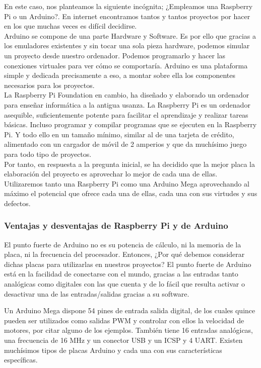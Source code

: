 En este caso, nos planteamos la siguiente incógnita; ¿Empleamos una Raspberry Pi o un Arduino?. En internet encontramos tantos y tantos proyectos por 
hacer en los que muchas veces es difícil decidirse.\\

Arduino se compone de una parte Hardware y Software. Es por ello que gracias a los emuladores existentes y sin tocar una sola pieza hardware, podemos simular un proyecto desde 
nuestro ordenador. Podemos programarlo y hacer las conexiones virtuales para ver cómo se comportaría. Arduino es una plataforma simple y dedicada precisamente a eso, 
a montar sobre ella los componentes necesarios para los proyectos. \\

La Raspberry Pi Foundation en cambio, ha diseñado y elaborado un ordenador para enseñar informática a la antigua usanza. La Raspberry Pi es un ordenador asequible, 
suficientemente potente para facilitar el aprendizaje y realizar tareas básicas. Incluso programar y compilar programas que se ejecuten en la Raspberry Pi. Y todo ello en un
tamaño mínimo, similar al de una tarjeta de crédito, alimentado con un cargador de móvil de 2 amperios y que da muchísimo juego para todo tipo de proyectos.\\

Por tanto, en respuesta a la pregunta inicial, se ha decidido que la mejor placa la elaboración del proyecto es aprovechar lo mejor de cada una de ellas. Utilizaremos tanto una Raspberry Pi
como una Arduino Mega aprovechando al máximo el potencial que ofrece cada una de ellas, cada una con sus virtudes y sus defectos.\\


\subsubsection{Ventajas y desventajas de Raspberry Pi y de Arduino}

El punto fuerte de Arduino no es su potencia de cálculo, ni la memoria de la placa, ni la frecuencia del procesador. Entonces, ¿Por qué debemos considerar dichas placas para
utilizarlas en nuestros proyectos? El punto fuerte de Arduino está en la facilidad de conectarse con el mundo, gracias a las entradas tanto analógicas como digitales con las que
cuenta y de lo fácil que resulta activar o desactivar una de las entradas/salidas gracias a su software.

Un Arduino Mega dispone 54 pines de entrada salida digital, de los cuales quince pueden ser utilizados como salidas PWM y controlar con ellos la velocidad de motores, por 
citar alguno de los ejemplos. También tiene 16 entradas analógicas, una frecuencia de 16 MHz y un conector USB y un ICSP y 4 UART. Existen muchísimos tipos de
placas Arduino y cada una con sus características específicas.\\

